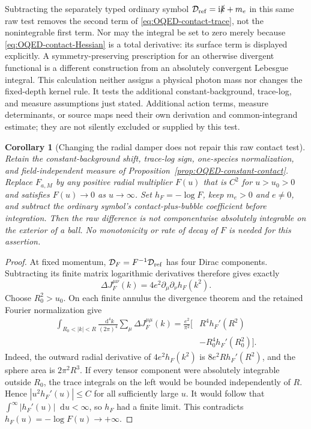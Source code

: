 \documentclass[final,5p,times,twocolumn,numbers,nopreprintline]{elsarticle}
\numberwithin{equation}{section}
\newtheorem{corollary}[theorem]{Corollary}
\theoremstyle{definition}
\theoremstyle{remark}
\newcommand{\dd}{\mathop{}\!\mathrm d}
\newcommand{\ii}{\mathrm i}
\begin{document}
Subtracting the separately typed ordinary symbol
\(\mathcal D_{\rm ref}=\ii\slashed k+m_e\) in this same raw test
removes the second term of \eqref{eq:OQED-contact-trace}, not the
nonintegrable first term. Nor may the integral be set to zero merely
because \eqref{eq:OQED-contact-Hessian} is a total derivative: its
surface term is displayed explicitly. A symmetry-preserving prescription
for an otherwise divergent functional is a different construction from
an absolutely convergent Lebesgue integral. This calculation neither
assigns a physical photon mass nor changes the fixed-depth kernel rule.
It tests the additional constant-background, trace-log, and measure
assumptions just stated. Additional action terms, measure determinants,
or source maps need their own derivation and common-integrand estimate;
they are not silently excluded or supplied by this test.

\begin{corollary}[Changing the radial damper does not repair this raw contact test]
\label{cor:OQED-general-contact-obstruction}
Retain the constant-background shift, trace-log sign, one-species
normalization, and field-independent measure of
Proposition~\ref{prop:OQED-constant-contact}. Replace \(F_{a,M}\) by
any positive radial multiplier \(F(u)\) that is \(C^2\) for
\(u>u_0>0\) and satisfies \(F(u)\to0\) as \(u\to\infty\).
Set \(h_F=-\log F\), keep \(m_e>0\) and \(e\ne0\), and subtract
the ordinary symbol's contact-plus-bubble coefficient \emph{before}
integration. Then the raw difference is not componentwise absolutely
integrable on the exterior of a ball. No monotonicity or rate of decay
of \(F\) is needed for this assertion.
\end{corollary}
\begin{proof}
At fixed momentum, \(\mathcal D_F=F^{-1}\mathcal D_{\rm ref}\)
has four Dirac components. Subtracting its finite matrix logarithmic
derivatives therefore gives exactly
\begin{equation}
 \Delta J_F^{\mu\nu}(k)
     =4e^2\partial_\mu\partial_\nu h_F(k^2).
 \label{eq:OQED-general-contact-difference}
\end{equation}
Choose \(R_0^2>u_0\). On each finite annulus the divergence theorem
and the retained Fourier normalization give
\begin{equation}
\begin{split}
 \int_{R_0<|k|<R}\frac{\dd^4k}{(2\pi)^4}
             \sum_\mu\Delta J_F^{\mu\mu}(k)
 =\frac{e^2}{\pi^2}\bigl[&R^4h_F'(R^2)\\
                      &-R_0^4h_F'(R_0^2)\bigr].
\end{split}
 \label{eq:OQED-general-contact-flux}
\end{equation}
Indeed, the outward radial derivative of \(4e^2h_F(k^2)\) is
\(8e^2R h_F'(R^2)\), and the sphere area is \(2\pi^2R^3\).
If every tensor component were absolutely integrable outside \(R_0\),
the trace integrals on the left would be bounded independently of \(R\).
Hence \(|u^2h_F'(u)|\leq C\) for all sufficiently large \(u\).
It would follow that \(\int^\infty |h_F'(u)|\dd u<\infty\), so
\(h_F\) had a finite limit. This contradicts
\(h_F(u)=-\log F(u)\to+\infty\).
\end{proof}
\end{document}
